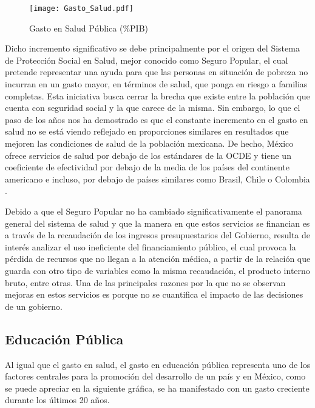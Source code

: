 \begin{figure}[H]
\centering
\texttt{[image: Gasto\_Salud.pdf]}
\caption{Gasto en Salud Pública (\%PIB)}
\label{Sal}
\end{figure}

Dicho incremento significativo se debe principalmente por el origen del Sistema de Protección Social en Salud, mejor conocido como Seguro Popular, el cual pretende representar una ayuda para que las personas en situación de pobreza no incurran en un gasto mayor, en términos de salud, que ponga en riesgo a familias completas. Esta iniciativa busca cerrar la brecha que existe entre la población que cuenta con seguridad social y la que carece de la misma. Sin embargo,  lo que el paso de los años nos ha demostrado es que el constante incremento en el gasto en salud no se está viendo reflejado en proporciones similares en resultados que mejoren las condiciones de salud de la población mexicana. De hecho,  México ofrece servicios de salud por debajo de los estándares de la OCDE y tiene un coeficiente de efectividad por debajo de la media de los países del continente americano e incluso, por debajo de países similares como Brasil, Chile o Colombia \cite{evaledu}. \bigskip

Debido a que el Seguro Popular no ha cambiado significativamente el panorama general del sistema de salud y que la manera en que estos servicios se financian es a través de la recaudación de los ingresos presupuestarios del Gobierno, resulta de interés analizar el uso ineficiente del financiamiento público, el cual provoca la pérdida de recursos que no llegan a la atención médica, a partir de la relación que guarda con otro tipo de variables como la misma recaudación, el producto interno bruto, entre otras. Una de las principales razones por la que no se observan mejoras en estos servicios es porque no se cuantifica el impacto de las decisiones de un gobierno.\bigskip




\subsection{Educación Pública}


Al igual que el gasto en salud, el gasto en educación pública representa uno de los factores centrales para la promoción del desarrollo de un país y en México, como se puede apreciar en la siguiente gráfica, se ha manifestado con un gasto creciente durante los últimos 20 años.


